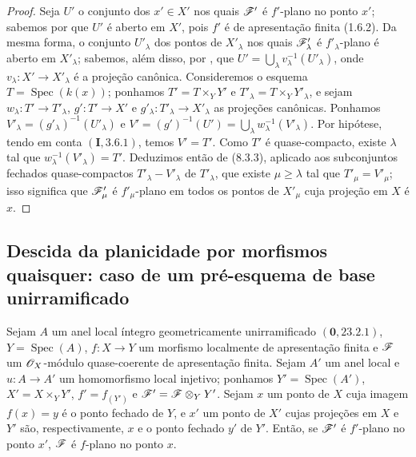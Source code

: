 \begin{proof}
Seja $U'$ o conjunto dos
$x'\in X'$ nos quais
$\mathscr{F}'$ é $f'$-plano no
ponto $x'$; sabemos por
 que $U'$
é aberto em $X'$, pois
$f'$ é de apresentação
finita (1.6.2). Da mesma
forma, o conjunto
$U'_\lambda$ dos pontos de
$X'_\lambda$ nos quais
$\mathscr{F}'_\lambda$ é
$f'_\lambda$-plano é aberto
em $X'_\lambda$; sabemos,
além disso, por
, que
$U'=\bigcup_\lambda
v_\lambda^{-1}(U'_\lambda)$,
onde $v_\lambda:X'\to
X'_\lambda$ é a projeção
canônica. Consideremos o
esquema
$T=\operatorname{Spec}(k(x))$;
ponhamos
$T'=T\times_Y Y'$ e
$T'_\lambda=T\times_Y
Y'_\lambda$, e sejam
$w_\lambda:T'\to T'_\lambda$,
$g':T'\to X'$ e
$g'_\lambda:T'_\lambda\to
X'_\lambda$ as projeções
canônicas. Ponhamos
$V'_\lambda=(g'_\lambda)^{-1}
(U'_\lambda)$ e
$V'=(g')^{-1}(U')=
\bigcup_\lambda w_\lambda^{-1}
(V'_\lambda)$. Por hipótese,
tendo em conta
$(\mathbf I,3.6.1)$, temos
$V'=T'$. Como $T'$ é
quase-compacto, existe
$\lambda$ tal que
$w_\lambda^{-1}(V'_\lambda)
=T'$. Deduzimos então de
(8.3.3), aplicado aos
subconjuntos fechados
quase-compactos
$T'_\lambda-V'_\lambda$
de $T'_\lambda$, que existe
$\mu\geq\lambda$ tal que
$T'_\mu=V'_\mu$; isso
significa que
$\mathscr{F}'_\mu$ é
$f'_\mu$-plano em todos os
pontos de $X'_\mu$ cuja
projeção em $X$ é $x$.
\end{proof}

\subsection{Descida da planicidade por morfismos quaisquer: caso de um pré-esquema de base unirramificado}
\label{subsection:IV.11.6}

\begin{theorem}[11.6.1]
\label{IV.11.6.1}
Sejam $A$ um anel local
íntegro geometricamente
unirramificado
$(\mathbf{0},23.2.1)$,
$Y=\operatorname{Spec}(A)$,
$f:X\to Y$ um morfismo
localmente de apresentação
finita e $\mathscr{F}$ um
$\mathscr{O}_X$-módulo
quase-coerente de apresentação
finita. Sejam $A'$ um anel
local e $u:A\to A'$ um
homomorfismo local injetivo;
ponhamos
$Y'=\operatorname{Spec}(A')$,
$X'=X\times_Y Y'$,
$f'=f_{(Y')}$ e
$\mathscr{F}'=\mathscr{F}\otimes_Y Y'$.
Sejam $x$ um ponto de $X$
cuja imagem $f(x)=y$ é
o ponto fechado de $Y$,
e $x'$ um ponto de $X'$
cujas projeções em $X$ e
$Y'$ são, respectivamente,
$x$ e o ponto fechado
$y'$ de $Y'$. Então, se
$\mathscr{F}'$ é $f'$-plano no
ponto $x'$, $\mathscr{F}$ é
$f$-plano no ponto $x$.
\end{theorem}

